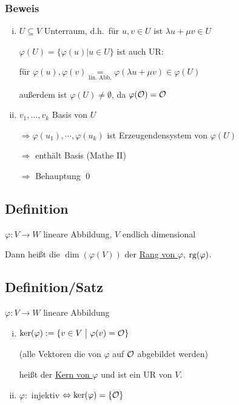 \subsubsection*{Beweis}

\begin{enumerate}[(i)]
	\item
	$U \subseteq V$ Unterraum, d.h.\ für $u,v \in U$ ist $\lambda u + \mu v \in U$
	
	$\varphi(U) = \{\varphi(u) \big | u \in U\}$ ist auch UR:
	
	für $\varphi(u), \varphi(v) \underset{\text{lin. Abb.}}{=} \varphi(\lambda u + \mu v) \in \varphi(U)$
	
	außerdem ist $\varphi(U) \neq \emptyset$, da $\varphi(\mathcal{O}) = \mathcal{O}$
	
	\item
	$v_1,\dots,v_k$ Basis von $U$
	
	$\Rightarrow \varphi(u_1),\cdots,\varphi(u_k)$ ist Erzeugendensystem von $\varphi(U)$
	
	$\Rightarrow$ enthält Basis (Mathe II)
	
	$\Rightarrow$ Behauptung
	\qed 
\end{enumerate}

\subsection{Definition}

$\varphi: V \rightarrow W$ lineare Abbildung, $V$ endlich dimensional

Dann heißt die $\dim(\varphi(V))$ der \underline{Rang von $\varphi$}, $\mathrm{ rg }(\varphi)$.

\subsection{Definition/Satz}
	\label{kern}

$\varphi: V \rightarrow W$ lineare Abbildung

\begin{enumerate}[(i)]
	\item
	$\ker(\varphi) := \{v \in V\; \big |\; \varphi(v) = \mathcal{O}\}$
	
	(alle Vektoren die von $\varphi$ auf $\mathcal{O}$ abgebildet werden)
	
	heißt der \underline{Kern von $\varphi$} und ist ein UR von $V$.
	

	\item
	$\varphi:$ injektiv $\Leftrightarrow \ker(\varphi) = \{\mathcal{O}\}$
\end{enumerate}

